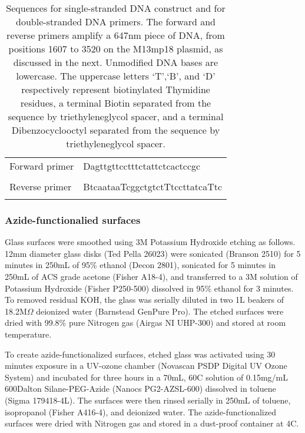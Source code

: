 \documentclass[%
  aip,12pt,tightenlines,
  amsthm,
 amsmath,amssymb
]{article}
\newcommand{\e}[0]{\\ \hline}
\newcommand{\tLabel}[1]{\label{table:#1}}
\newcommand{\sLabel}[1]{\label{section:#1}}
\newcommand{\pcaption}[1]{\caption{\noindent#1}}
\newcommand{\firstp}[0]{}
\newcommand{\pl}[0]{\vspace{6pt}}
\newcommand{\supply}[2]{(#1 #2)}
\newcommand{\degreeC}[0]{\degree{}C}
\begin{document}
\begin{table}
\begin{tabularx}{\textwidth}{ l | l  }
\hline \hline
Forward primer & Dagttgttcctttctattctcactccgc \\ \e 
Reverse primer & BtcaataaTcggctgtctTtccttatcaTtc \\ \e 
\end{tabularx}
\pcaption{\tLabel{Sequences}Sequences for single-stranded DNA construct and for double-stranded DNA primers. The forward and reverse primers amplify a 647nm piece of DNA, from positions 1607 to 3520 on the M13mp18 plasmid, as discussed in the next. Unmodified DNA bases are lowercase. The uppercase letters `T',`B', and `D' respectively represent biotinylated Thymidine residues, a terminal Biotin separated from the sequence by triethyleneglycol spacer, and a terminal Dibenzocyclooctyl separated from the sequence by triethyleneglycol spacer.}
\end{table}


\subsubsection{\sLabel{Surface}Azide-functionalied surfaces}

\firstp Glass surfaces were smoothed using 3M Potassium Hydroxide etching as follows. 12mm diameter glass disks \supply{Ted Pella}{26023} were sonicated \supply{Branson}{2510} for 5 minutes in 250mL of 95\% ethanol \supply{Decon}{2801}, sonicated  for 5 minutes in 250mL of ACS grade acetone \supply{Fisher}{A18-4}, and transferred to a 3M solution of Potassium Hydroxide \supply{Fisher}{P250-500} dissolved in 95\% ethanol for 3 minutes. To removed residual KOH, the glass was serially diluted in two 1L beakers of 18.2M$\Omega$ deionized water \supply{Barnstead}{GenPure Pro}. The etched surfaces were dried with 99.8\% pure Nitrogen gas \supply{Airgas}{NI UHP-300} and stored at room temperature. \pl

To create azide-functionalized surfaces, etched glass was activated using 30 minutes exposure in a UV-ozone chamber \supply{Novascan}{PSDP Digital UV Ozone System} and incubated for three hours in a 70mL, 60\degreeC{} solution of 0.15mg/mL 600Dalton Silane-PEG-Azide \supply{Nanocs}{PG2-AZSL-600} dissolved in toluene \supply{Sigma}{179418-4L}. The surfaces were then rinsed serially in 250mL of toluene, isopropanol \supply{Fisher}{A416-4}, and deionized water. The azide-functionalized surfaces were dried with Nitrogen gas and stored in a dust-proof container at 4\degreeC{}. \pl 
\end{document}
